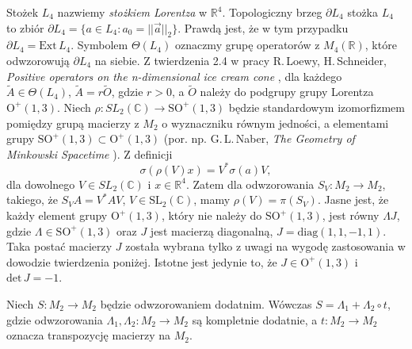 Stożek $L_{4}$ nazwiemy \emph{stożkiem Lorentza} w $\mathbb{R}^{4}$.
Topologiczny brzeg $\partial L_{4}$ stożka $L_{4}$ to zbiór
$\partial L_{4} = \{ a \in L_{4} : a_{0} = || \vec{a} ||_{2} \}$.
Prawdą jest, że w tym przypadku $\partial L_{4} = \text{Ext}\,L_{4}$.
Symbolem $\Theta(L_{4})$ oznaczmy grupę operatorów z $M_{4}(\mathbb{R})$,
które odwzorowują $\partial L_{4}$ na siebie.
Z twierdzenia 2.4 w pracy
R.\,Loewy, H.\,Schneider,
\emph{Positive operators on the n-dimensional ice cream cone}
\cite{loewy1975positive},
dla każdego $\tilde{A} \in \Theta(L_{4})$,
$\tilde{A} = r \tilde{O}$,
gdzie $r > 0$, a $\tilde{O}$ należy do
podgrupy grupy Lorentza $\mathrm{O}^{+}(1,3)$.
Niech $\rho: SL_{2}(\mathbb{C}) \rightarrow \text{SO}^{+}(1,3)$
będzie standardowym izomorfizmem pomiędzy grupą macierzy z $M_{2}$
o wyznaczniku równym jedności, a elementami grupy $\text{SO}^{+}(1,3) \subset \text{O}^{+}(1,3)$
(por. np. G.\,L.\,Naber, \emph{The Geometry of Minkowski Spacetime}
\cite{Naber1992}).
Z definicji
\begin{equation}
\sigma(\rho(V) x) = V^{*} \sigma(a) V,
\end{equation}
dla dowolnego $V \in SL_{2}(\mathbb{C})$ i $x \in \mathbb{R}^{4}$.
Zatem dla odwzorowania $S_{V}: M_{2} \rightarrow M_{2}$,
takiego, że $S_{V} A = V^{*} A V$, $V \in \text{SL}_{2}(\mathbb{C})$,
mamy $\rho(V) = \pi(S_{V})$.
Jasne jest, że każdy element grupy $\text{O}^{+}(1,3)$,
który nie należy do  $\text{SO}^{+}(1,3)$,
jest równy $\Lambda J$,
gdzie $\Lambda \in \text{SO}^{+}(1,3)$ oraz $J$ jest macierzą diagonalną,
$J = \mathrm{diag}(1,1,-1,1)$.
Taka postać macierzy $J$ została wybrana tylko z uwagi na wygodę zastosowania
w dowodzie twierdzenia poniżej.
Istotne jest jedynie to, że
$J \in \text{O}^{+}(1,3)$ i $\mathrm{det} \, J = -1$.

\begin{Theorem}
\label{thm:PositiveMapsOnM2}
    Niech $S:M_{2} \rightarrow M_{2}$ będzie odwzorowaniem dodatnim.
    Wówczas $S = \Lambda_{1}  + \Lambda_{2} \circ t$,
    gdzie odwzorowania
    $\Lambda_{1}, \Lambda_{2}:M_{2} \rightarrow M_{2}$
    są kompletnie dodatnie, a
    $t: M_{2} \rightarrow M_{2}$ oznacza transpozycję macierzy na $M_{2}$.
\end{Theorem}

